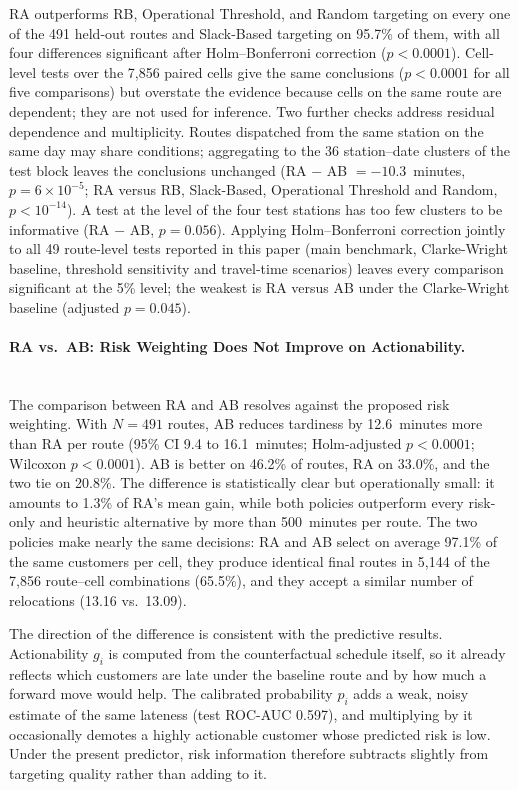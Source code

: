 \documentclass[11pt,a4paper]{article}
\begin{document}
RA outperforms RB, Operational Threshold, and Random targeting on every one of the 491 held-out routes and Slack-Based targeting on 95.7\% of them, with all four differences significant after Holm--Bonferroni correction ($p < 0.0001$). Cell-level tests over the 7,856 paired cells give the same conclusions ($p < 0.0001$ for all five comparisons) but overstate the evidence because cells on the same route are dependent; they are not used for inference. Two further checks address residual dependence and multiplicity. Routes dispatched from the same station on the same day may share conditions; aggregating to the 36 station--date clusters of the test block leaves the conclusions unchanged (RA $-$ AB $= -10.3$~minutes, $p = 6 \times 10^{-5}$; RA versus RB, Slack-Based, Operational Threshold and Random, $p < 10^{-14}$). A test at the level of the four test stations has too few clusters to be informative (RA $-$ AB, $p = 0.056$). Applying Holm--Bonferroni correction jointly to all 49 route-level tests reported in this paper (main benchmark, Clarke-Wright baseline, threshold sensitivity and travel-time scenarios) leaves every comparison significant at the 5\% level; the weakest is RA versus AB under the Clarke-Wright baseline (adjusted $p = 0.045$).

\paragraph{RA vs.\ AB: Risk Weighting Does Not Improve on Actionability.}\mbox{}\\
The comparison between RA and AB resolves against the proposed risk weighting. With $N = 491$ routes, AB reduces tardiness by 12.6~minutes more than RA per route (95\% CI 9.4 to 16.1~minutes; Holm-adjusted $p < 0.0001$; Wilcoxon $p < 0.0001$). AB is better on 46.2\% of routes, RA on 33.0\%, and the two tie on 20.8\%. The difference is statistically clear but operationally small: it amounts to 1.3\% of RA's mean gain, while both policies outperform every risk-only and heuristic alternative by more than 500~minutes per route. The two policies make nearly the same decisions: RA and AB select on average 97.1\% of the same customers per cell, they produce identical final routes in 5,144 of the 7,856 route--cell combinations (65.5\%), and they accept a similar number of relocations (13.16 vs.\ 13.09).

The direction of the difference is consistent with the predictive results. Actionability $g_i$ is computed from the counterfactual schedule itself, so it already reflects which customers are late under the baseline route and by how much a forward move would help. The calibrated probability $p_i$ adds a weak, noisy estimate of the same lateness (test ROC-AUC 0.597), and multiplying by it occasionally demotes a highly actionable customer whose predicted risk is low. Under the present predictor, risk information therefore subtracts slightly from targeting quality rather than adding to it.
\end{document}
